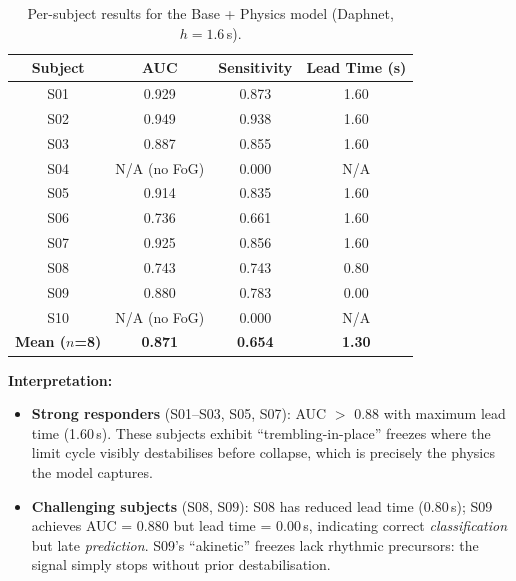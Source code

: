 \documentclass[12pt,a4paper]{article}
\begin{document}
\begin{table}[ht]
\centering
\caption{Per-subject results for the Base + Physics model (Daphnet, $h=1.6$\,s).}
\label{tab:persubj}
\renewcommand{\arraystretch}{1.25}
\begin{tabular}{cccc}
\toprule
\textbf{Subject} & \textbf{AUC} & \textbf{Sensitivity} & \textbf{Lead Time (s)} \\
\midrule
S01 & 0.929 & 0.873 & 1.60 \\
S02 & 0.949 & 0.938 & 1.60 \\
S03 & 0.887 & 0.855 & 1.60 \\
S04 & N/A {\scriptsize(no FoG)} & 0.000 & N/A \\
S05 & 0.914 & 0.835 & 1.60 \\
S06 & 0.736 & 0.661 & 1.60 \\
S07 & 0.925 & 0.856 & 1.60 \\
S08 & 0.743 & 0.743 & 0.80 \\
S09 & 0.880 & 0.783 & 0.00 \\
S10 & N/A {\scriptsize(no FoG)} & 0.000 & N/A \\
\midrule
\textbf{Mean ($n$=8)} & \textbf{0.871} & \textbf{0.654} & \textbf{1.30} \\
\bottomrule
\end{tabular}
\end{table}

\vspace{4pt}
\noindent\textbf{Interpretation:}
\begin{itemize}[leftmargin=*, itemsep=3pt]
  \item \textbf{Strong responders} (S01--S03, S05, S07): AUC $>$ 0.88 with maximum lead
        time (1.60\,s). These subjects exhibit ``trembling-in-place'' freezes where the
        limit cycle visibly destabilises before collapse, which is precisely the physics
        the model captures.
  \item \textbf{Challenging subjects} (S08, S09): S08 has reduced lead time (0.80\,s); S09
        achieves AUC = 0.880 but lead time = 0.00\,s, indicating correct \emph{classification}
        but late \emph{prediction}. S09's ``akinetic'' freezes lack rhythmic precursors:
        the signal simply stops without prior destabilisation.
\end{itemize}
\end{document}
